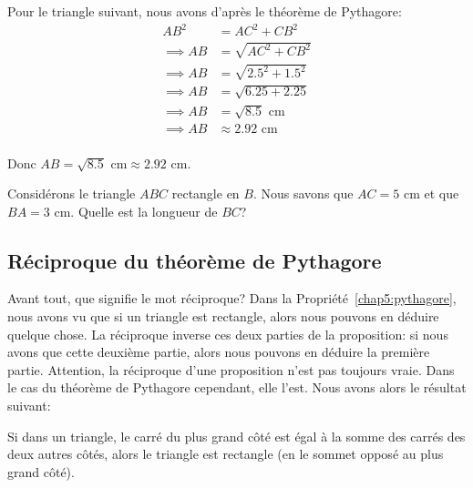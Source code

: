 \begin{exemple}
    Pour le triangle suivant, nous avons d'après le théorème de Pythagore:
    \begin{align*}
        AB^2 & = AC^2 + CB^2\\
        \implies AB & = \sqrt{AC^2 + CB^2}\\
        \implies AB & = \sqrt{2.5^2 + 1.5^2}\\
        \implies AB & = \sqrt{6.25 + 2.25}\\
        \implies AB & = \sqrt{8.5} \text{ cm}\\
        \implies AB & \approx 2.92 \text{ cm}\\
    \end{align*}

    Donc $AB = \sqrt{8.5} \text{ cm} \approx 2.92 \text{ cm}$. \hfill
\end{exemple}

\begin{exercice}
    Considérons le triangle $ABC$ rectangle en $B$. Nous savons que $AC = 5\text{ cm}$ et que $BA = 3 \text{ cm}$. Quelle est la longueur de $BC$?
\end{exercice}

\subsection{Réciproque du théorème de Pythagore}

Avant tout, que signifie le mot réciproque? Dans la Propriété~\ref{chap5:pythagore}, nous avons vu que si un triangle est rectangle, alors nous pouvons en déduire quelque chose. La réciproque inverse ces deux parties de la proposition: si nous avons que cette deuxième partie, alors nous pouvons en déduire la première partie. Attention, la réciproque d'une proposition n'est pas toujours vraie. Dans le cas du théorème de Pythagore cependant, elle l'est. Nous avons alors le résultat suivant:

\begin{propriete}\label{chap5:reciproque}
    Si dans un triangle, le carré du plus grand côté est égal à la somme des carrés des deux autres côtés, alors le triangle est rectangle (en le sommet opposé au plus grand côté).
\end{propriete}

